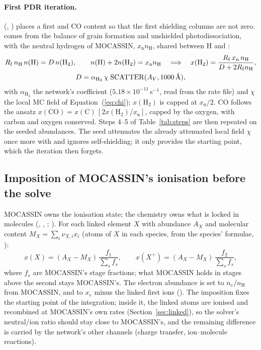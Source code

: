 \paragraph{First PDR iteration.} 
(, ) places a first \Htwo{} and CO
content so that the first shielding columns are not zero. \Htwo{} comes from the
balance of grain formation and unshielded photodissociation, with the neutral
hydrogen of MOCASSIN, $x_{\mathrm n}n_{\mathrm H}$, shared between H and \Htwo:
\begin{gather}
  R_{\mathrm f}\,n_{\mathrm H}\,n(\mathrm H) = D\,n(\mathrm{H_2}),\qquad
  n(\mathrm H)+2n(\mathrm{H_2}) = x_{\mathrm n}n_{\mathrm H}
  \quad\Longrightarrow\quad
  x(\mathrm{H_2}) = \frac{R_{\mathrm f}\,x_{\mathrm n}\,n_{\mathrm H}}{D+2R_{\mathrm f}n_{\mathrm H}},\\
  D = \alpha_{\mathrm{H_2}}\,\chi\;\mathrm{SCATTER}(A_{V},1000\,\text{\AA}),
\end{gather}
with $\alpha_{\mathrm{H_2}}$ the network's coefficient ($5.18\times10^{-11}$\,s$^{-1}$, read
from the rate file) and $\chi$ the local MC field of Equation~(\ref{eq:chi});
$x(\mathrm{H_2})$ is capped at $x_{\mathrm n}/2$. CO follows the ansatz
$x(\mathrm{CO}) = x(\mathrm C)\,[2x(\mathrm{H_2})/x_{\mathrm n}]$, capped by the oxygen,
with carbon and oxygen conserved. Steps 4--5 of Table~\ref{tab:steps} are then
repeated on the seeded abundances. The seed attenuates the already attenuated
local field $\chi$ once more with  and ignores self-shielding; it
only provides the starting point, which the iteration then forgets.

\subsection{Imposition of MOCASSIN's ionisation before the solve}
\label{sec:impose}

MOCASSIN owns the ionisation state; the chemistry owns what is locked in
molecules (, , ;
). For each linked element $X$ with abundance
$A_X$ and molecular content $M_X=\sum_i \nu_{X,i}x_i$ (atoms of $X$ in each
species, from the species' formulae, ):
\begin{equation}
  x(X) = (A_X-M_X)\,\frac{f_1}{\sum_s f_s},\qquad
  x(X^+) = (A_X-M_X)\,\frac{f_2}{\sum_s f_s},
\end{equation}
where $f_s$ are MOCASSIN's stage fractions; what MOCASSIN holds in stages
above the second stays MOCASSIN's. The electron abundance is set to
$n_e/n_{\mathrm H}$ from MOCASSIN, and  to $x_e$ minus the
linked first ions (). The imposition fixes the starting
point of the integration; inside it, the linked atoms are ionised and
recombined at MOCASSIN's own rates (Section~\ref{sec:linked}), so the solver's
neutral/ion ratio should stay close to MOCASSIN's, and the remaining
difference is carried by the network's other channels (charge transfer,
ion--molecule reactions).

